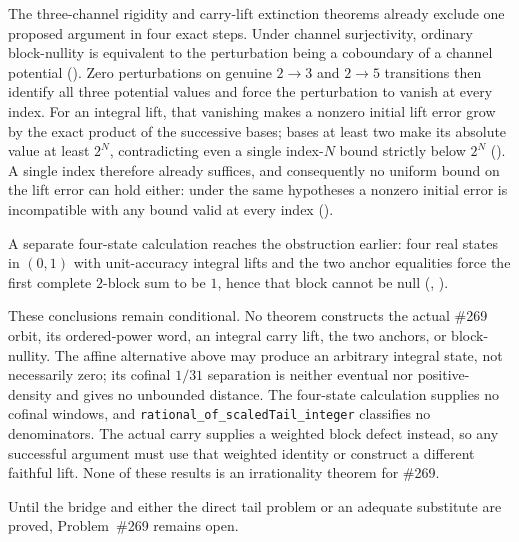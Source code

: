 \documentclass[11pt]{article}
\begin{document}
The three-channel rigidity and carry-lift extinction theorems already exclude
one proposed argument in four exact steps.  Under channel surjectivity, ordinary
block-nullity is equivalent to the perturbation being a coboundary of a
channel potential
().  Zero perturbations on genuine $2\to3$ and $2\to5$ transitions
then identify all three potential values and force the perturbation to vanish
at every index.  For an integral lift, that vanishing makes a nonzero initial
lift error grow by the exact product of the successive bases; bases at least
two make its absolute value at least $2^N$, contradicting even a single
index-$N$ bound strictly below $2^N$
().  A single index therefore already suffices, and consequently no
uniform bound on the lift error can hold either: under the same hypotheses a
nonzero initial error is incompatible with any bound valid at every index
().

A separate four-state calculation reaches the obstruction earlier: four real
states in $(0,1)$ with unit-accuracy integral lifts and the two anchor
equalities force the first complete $2$-block sum to be $1$, hence that block
cannot be null
(,
).

These conclusions remain conditional.  No theorem constructs the
actual \#269 orbit, its ordered-power word, an integral carry lift, the two
anchors, or block-nullity.  The affine alternative above may produce an
arbitrary integral state, not necessarily zero; its cofinal $1/31$ separation
is neither eventual nor positive-density and gives no unbounded distance.
The four-state calculation supplies no cofinal windows, and
\texttt{rational\_of\_scaledTail\_integer} classifies no denominators.  The
actual carry supplies a weighted block defect instead, so any successful
argument must use that weighted identity or construct a different faithful
lift.  None of these results is an irrationality theorem for \#269.

Until the bridge and either the direct tail problem or an adequate substitute
are proved, Problem~\#269 remains open.
\end{document}
